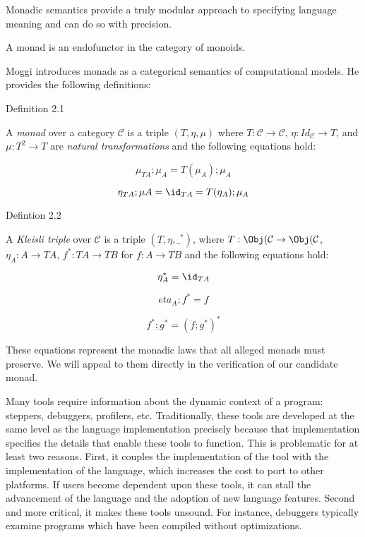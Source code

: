 \documentclass[ms]{byuprop} %
\begin{document}
Monadic semantics provide a truly modular approach to specifying language meaning and can
do so with precision.


A monad is an endofunctor in the category of monoids.

Moggi \cite{moggi1989computational} introduces monads as a categorical semantics of
computational models. He provides the following definitions:

Definition 2.1

A \emph{monad} over a category $\mathcal{C}$ is a triple $(T,\eta,\mu)$ where
$T:\mathcal{C}\rightarrow\mathcal{C}$, $\eta:Id_{\mathcal{C}}\rightarrow T$, and
$\mu:T^{2}\rightarrow T$ are \emph{natural transformations} and the following equations
hold:

\[
\mu_{TA};\mu_{A}=T(\mu_{A});\mu_{A}
\]

\[
\eta_{TA};\mu{A}=\id_{TA}=T(\eta_{A});\mu_{A}
\]

Defintion 2.2

A \emph{Kleisli triple} over $\mathcal{C}$ is a triple $(T,\eta,\_^{*})$, where
$T:\Obj(\mathcal{C}\rightarrow \Obj(\mathcal{C}$, $\eta_{A}:A\rightarrow TA$,
$f^{*}:TA\rightarrow TB$ for $f:A\rightarrow TB$ and the following equations hold:

\[
\eta_{A}^{*}=\id_{TA}
\]

\[
eta_{A};f^{*}=f
\]

\[
f^{*};g^{*}=(f;g^{*})^{*}
\]

These equations represent the monadic laws that all alleged monads must preserve. We will
appeal to them directly in the verification of our candidate monad.


Many tools require information about the dynamic context of a program: steppers,
debuggers, profilers, etc. Traditionally, these tools are developed at the same level as
the language implementation precisely because that implementation specifies the details
that enable these tools to function. This is problematic for at least two reasons. First,
it couples the implementation of the tool with the implementation of the language, which
increases the cost to port to other platforms. If users become dependent upon these tools,
it can stall the advancement of the language and the adoption of new language features.
Second and more critical, it makes these tools unsound. For instance, debuggers typically
examine programs which have been compiled without optimizations.
\end{document}
